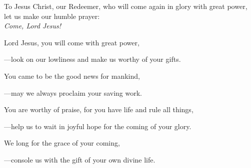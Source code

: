 \intercessions\indent

\begin{hangpar}

To Jesus Christ, our Redeemer, who will come again in glory with great power, let us make our humble prayer:\\
\emph{Come, Lord Jesus!}

\medskip Lord Jesus, you will come with great power,

{\color{red}---\thinspace}look on our lowliness and make us worthy of your gifts.

\medskip You came to be the good news for mankind,

{\color{red}---\thinspace}may we always proclaim your saving work.

\medskip You are worthy of praise, for you have life and rule all things,

{\color{red}---\thinspace}help us to wait in joyful hope for the coming of your glory.

\medskip We long for the grace of your coming,

{\color{red}---\thinspace}console us with the gift of your own divine life.

\medskip

\end{hangpar}